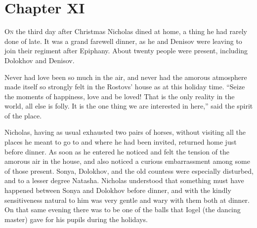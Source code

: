 
\chapter*{Chapter XI}
\ifaudio     
{} 
\fi

\lettrine[lines=2, loversize=0.3, lraise=0]{\initfamily O}{n}
the third day after Christmas Nicholas dined at home, a thing
he had rarely done of late. It was a grand farewell dinner, as he
and Denisov were leaving to join their regiment after
Epiphany. About twenty people were present, including Dolokhov
and Denisov.

Never had love been so much in the air, and never had the amorous
atmosphere made itself so strongly felt in the Rostovs' house as
at this holiday time. ``Seize the moments of happiness, love and
be loved! That is the only reality in the world, all else is
folly. It is the one thing we are interested in here,'' said the
spirit of the place.

Nicholas, having as usual exhausted two pairs of horses, without
visiting all the places he meant to go to and where he had been
invited, returned home just before dinner. As soon as he entered
he noticed and felt the tension of the amorous air in the house,
and also noticed a curious embarrassment among some of those
present. Sonya, Dolokhov, and the old countess were especially
disturbed, and to a lesser degree Natasha. Nicholas understood
that something must have happened between Sonya and Dolokhov
before dinner, and with the kindly sensitiveness natural to him
was very gentle and wary with them both at dinner. On that same
evening there was to be one of the balls that Iogel (the dancing
master) gave for his pupils during the holidays.

